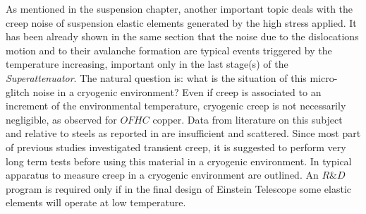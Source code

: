As mentioned in the suspension chapter, another important topic deals with the creep noise of suspension elastic elements generated by the high stress applied. It has been already shown in the same section  that the noise due to the dislocations motion and to their avalanche formation are typical events triggered by the temperature increasing, important only in the last stage(s) of the \emph{Superattenuator}. The natural question is: what is the situation of this micro-glitch noise in a cryogenic environment? Even if creep is associated to an increment of the environmental temperature, cryogenic creep is not necessarily negligible, as observed for $OFHC$ copper. Data from literature on this subject and relative to steels as reported in \cite{Poggiani2010} are insufficient and scattered. Since most part of previous studies investigated transient creep, it is suggested to perform very long term tests before using this material in a cryogenic environment. In \cite{Poggiani2010} typical apparatus to measure creep in a cryogenic environment are outlined. An $R\&D$ program is required only if in the final design of Einstein Telescope some elastic elements will operate at low temperature. 





